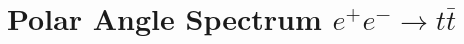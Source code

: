 \documentclass[preprint]{elsarticle}
\newcommand{\qgsp}{{\sc qgsp\_bert}}
\newcommand{\ecal}{Si-W ECAL}
\newcommand{\tfa}{track-finding algorithm}
\newcommand{\ep}{$\varepsilon$ parameter}
\begin{document}



\clearpage


\section*{Polar Angle Spectrum $e^+e^-\rightarrow t\bar{t}$}
\end{document}
